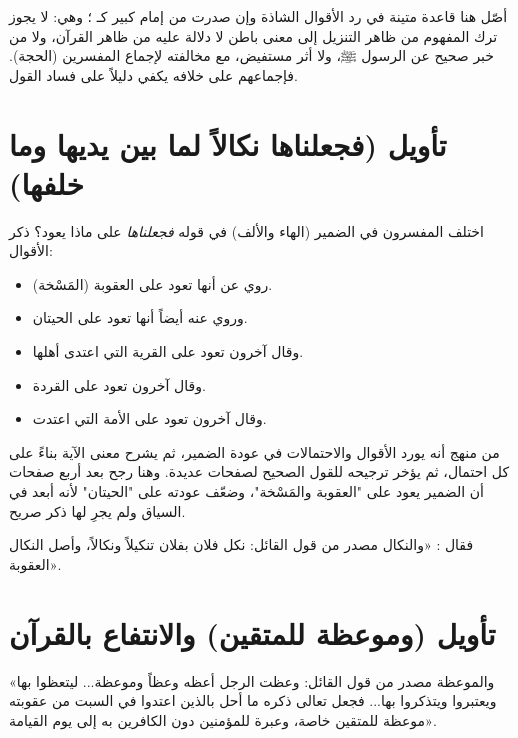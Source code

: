 \begin{fawaid}
أصّل  هنا قاعدة متينة في رد الأقوال الشاذة وإن صدرت من إمام كبير كـ ؛ وهي: لا يجوز ترك المفهوم من ظاهر التنزيل إلى معنى باطن لا دلالة عليه من ظاهر القرآن، ولا من خبر صحيح عن الرسول ﷺ، ولا أثر مستفيض، مع مخالفته لإجماع المفسرين (الحجة). فإجماعهم على خلافه يكفي دليلاً على فساد القول.
\end{fawaid}

\separator

\section{تأويل (فجعلناها نكالاً لما بين يديها وما خلفها)}
اختلف المفسرون في الضمير (الهاء والألف) في قوله \textit{فجعلناها} على ماذا يعود؟
ذكر  الأقوال:
\begin{itemize}
    \item روي عن  أنها تعود على العقوبة (المَسْخة).
    \item وروي عنه أيضاً أنها تعود على الحيتان.
    \item وقال آخرون تعود على القرية التي اعتدى أهلها.
    \item وقال آخرون تعود على القردة.
    \item وقال آخرون تعود على الأمة التي اعتدت.
\end{itemize}

\begin{fawaid}
من منهج  أنه يورد الأقوال والاحتمالات في عودة الضمير، ثم يشرح معنى الآية بناءً على كل احتمال، ثم يؤخر ترجيحه للقول الصحيح لصفحات عديدة. وهنا رجح بعد أربع صفحات أن الضمير يعود على "العقوبة والمَسْخة"، وضعّف عودته على "الحيتان" لأنه أبعد في السياق ولم يجرِ لها ذكر صريح.
\end{fawaid}

 فقال : «والنكال مصدر من قول القائل: نكل فلان بفلان تنكيلاً ونكالاً، وأصل النكال العقوبة».

\separator

\section{تأويل (وموعظة للمتقين) والانتفاع بالقرآن}
 «والموعظة مصدر من قول القائل: وعظت الرجل أعظه وعظاً وموعظة... ليتعظوا بها ويعتبروا ويتذكروا بها... فجعل تعالى ذكره ما أحل بالذين اعتدوا في السبت من عقوبته موعظة للمتقين خاصة، وعبرة للمؤمنين دون الكافرين به إلى يوم القيامة».

